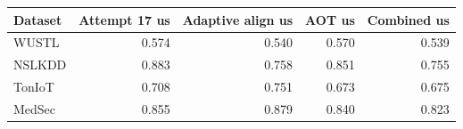 \begin{tabular}{lrrrr}
\toprule
Dataset & Attempt 17 us & Adaptive align us & AOT us & Combined us \\
\midrule
WUSTL & 0.574 & 0.540 & 0.570 & 0.539 \\
NSLKDD & 0.883 & 0.758 & 0.851 & 0.755 \\
TonIoT & 0.708 & 0.751 & 0.673 & 0.675 \\
MedSec & 0.855 & 0.879 & 0.840 & 0.823 \\
\bottomrule
\end{tabular}
